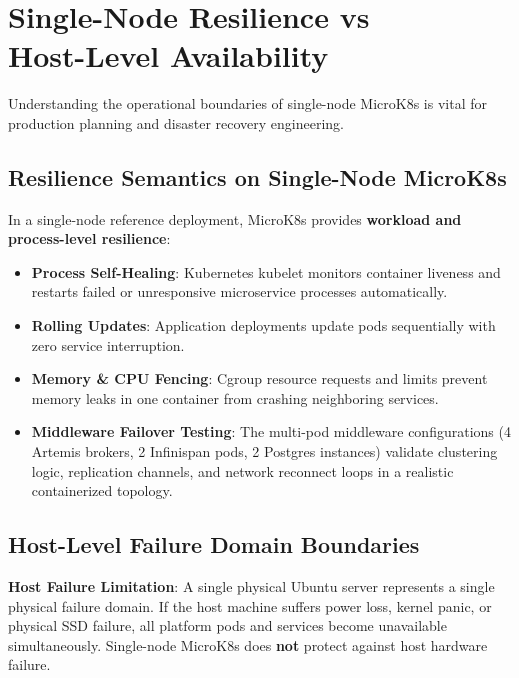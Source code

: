 
\chapter[Single-Node Resilience vs Host-Level Availability]{Single-Node Resilience vs\\Host-Level Availability}
\label{chap:resilience_ha}

Understanding the operational boundaries of single-node MicroK8s is vital for production planning and disaster recovery engineering.

\section{Resilience Semantics on Single-Node MicroK8s}

In a single-node reference deployment, MicroK8s provides \textbf{workload and process-level resilience}:
\begin{itemize}
    \item \textbf{Process Self-Healing}: Kubernetes kubelet monitors container liveness and restarts failed or unresponsive microservice processes automatically.
    \item \textbf{Rolling Updates}: Application deployments update pods sequentially with zero service interruption.
    \item \textbf{Memory \& CPU Fencing}: Cgroup resource requests and limits prevent memory leaks in one container from crashing neighboring services.
    \item \textbf{Middleware Failover Testing}: The multi-pod middleware configurations (4 Artemis brokers, 2 Infinispan pods, 2 Postgres instances) validate clustering logic, replication channels, and network reconnect loops in a realistic containerized topology.
\end{itemize}

\section{Host-Level Failure Domain Boundaries}

\begin{archinote}
\textbf{Host Failure Limitation}: A single physical Ubuntu server represents a single physical failure domain. If the host machine suffers power loss, kernel panic, or physical SSD failure, all platform pods and services become unavailable simultaneously. Single-node MicroK8s does \textbf{not} protect against host hardware failure.
\end{archinote}

